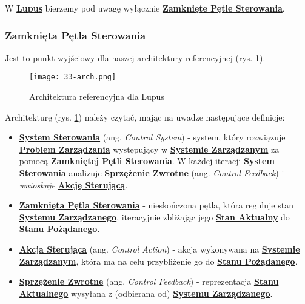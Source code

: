 W \hyperlink{def:lupus}{\textbf{Lupus}} bierzemy pod uwagę wyłącznie \hyperlink{def:zamknieta-petla-sterowania}{\textbf{Zamknięte Pętle Sterowania}}.

\subsubsection{Zamknięta Pętla Sterowania}

Jest to punkt wyjściowy dla naszej architektury referencyjnej (rys. \ref{fig:33-arch}).

\begin{figure}[!h]
    \centering \texttt{[image: 33-arch.png]}
    \caption{Architektura referencyjna dla Lupus}\label{fig:33-arch}
\end{figure}

Architekturę (rys. \ref{fig:33-arch}) należy czytać, mając na uwadze następujące definicje:

\begin{itemize}
    \item \hyperlink{def:system-sterowania}{\textbf{System Sterowania}} (ang. \textit{Control System}) - system, który rozwiązuje \hyperlink{def:problem-zarzadzania}{\textbf{Problem Zarządzania}} występujący w \hyperlink{def:system-zarzadzany}{\textbf{Systemie Zarządzanym}} za pomocą \hyperlink{def:zamknieta-petla-sterowania}{\textbf{Zamkniętej Pętli Sterowania}}. W każdej iteracji \hyperlink{def:system-sterowania}{\textbf{System Sterowania}} analizuje \hyperlink{def:sprzezenie-zwrotne}{\textbf{Sprzężenie Zwrotne}} (ang. \textit{Control Feedback}) i \textit{wnioskuje} \hyperlink{def:akcja-sterujaca}{\textbf{Akcję Sterującą}}.
    \item \hyperlink{def:zamknieta-petla-sterowania}{\textbf{Zamknięta Pętla Sterowania}} - nieskończona pętla, która reguluje stan \hyperlink{def:system-zarzadzany}{\textbf{Systemu Zarządzanego}}, iteracyjnie zbliżając jego \hyperlink{def:stan-aktualny}{\textbf{Stan Aktualny}} do \hyperlink{def:stan-pozadany}{\textbf{Stanu Pożądanego}}. 
    \item \hyperlink{def:akcja-sterujaca}{\textbf{Akcja Sterująca}} (ang. \textit{Control Action}) - akcja wykonywana na \hyperlink{def:system-zarzadzany}{\textbf{Systemie Zarządzanym}}, która ma na celu przybliżenie go do \hyperlink{def:stan-pozadany}{\textbf{Stanu Pożądanego}}.
    \item \hyperlink{def:sprzezenie-zwrotne}{\textbf{Sprzężenie Zwrotne}} (ang. \textit{Control Feedback}) - reprezentacja \hyperlink{def:stan-aktualny}{\textbf{Stanu Aktualnego}} wysyłana z (odbierana od) \hyperlink{def:system-zarzadzany}{\textbf{Systemu Zarządzanego}}.
\end{itemize}

